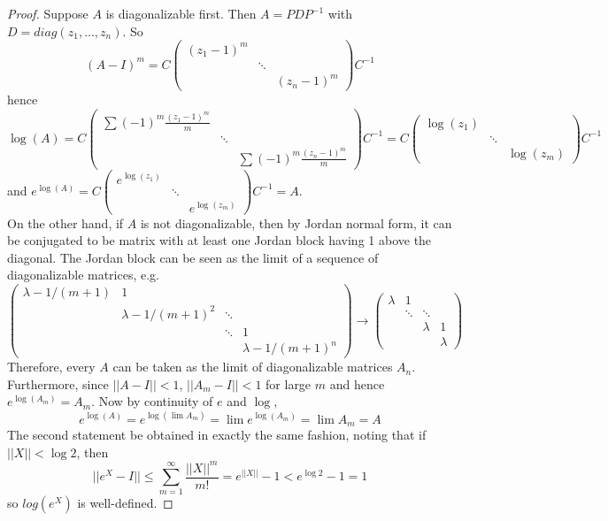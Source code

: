 \documentclass[11pt]{book}
\begin{document}
\begin{proof}
Suppose $A$ is diagonalizable first. Then $A = PDP^{-1}$ with $D = diag(z_1, \dots, z_n)$. So
$$(A-I)^m = C \left( \begin{array}{ccc}
(z_1-1)^m &  &  \\
 & \ddots &  \\
& & (z_n - 1)^m \end{array} \right)C^{-1}$$
hence
$$\log(A) = C \left( \begin{array}{ccc}
\sum (-1)^m \frac{(z_1-1)^m}{m} &  &  \\
 & \ddots &  \\
& & \sum (-1)^m \frac{(z_n - 1)^m}{m} \end{array} \right)C^{-1} = C \left( \begin{array}{ccc}
\log(z_1)  &  \\
 & \ddots &  \\
& & \log(z_m) \end{array} \right)C^{-1}$$
and $e^{\log(A)} = C \left( \begin{array}{ccc}
e^{\log(z_1)}  &  \\
 & \ddots &  \\
& & e^{\log(z_m)} \end{array} \right)C^{-1} = A$.\\
On the other hand, if $A$ is not diagonalizable, then by Jordan normal form, it can be conjugated to be matrix with at least one Jordan block having 1 above the diagonal. The Jordan block can be seen as the limit of a sequence of diagonalizable matrices, e.g.
$$\left( \begin{array}{cccc}
\lambda - 1/(m+1)  & 1 & &  \\
 & \lambda - 1/(m+1)^2 & \ddots & \\
& & \ddots & 1\\
&&& \lambda - 1/(m+1)^n \end{array} \right) \to  \left( \begin{array}{cccc}
\lambda  & 1 & &  \\
 & \ddots & \ddots & \\
& & \lambda & 1\\
&&& \lambda \end{array} \right)$$
Therefore, every $A$ can be taken as the limit of diagonalizable matrices $A_n$. Furthermore, since $||A-I||< 1$, $||A_m - I||<1$ for large $m$ and hence $e^{\log(A_m)} = A_m$. Now by continuity of $e$ and $\log$,
$$e^{\log(A)} = e^{\log(\lim A_m)} = \lim e^{\log(A_m)}  = \lim A_m = A$$
The second statement be obtained in exactly the same fashion, noting that if $||X|| < \log 2$, then
$$||e^X - I|| \leq \sum_{m = 1}^{\infty}\frac{||X||^m}{m!} = e^{||X||} - 1 < e^{\log 2} - 1 = 1$$
so $log(e^X)$ is well-defined.
\end{proof}
\end{document}
